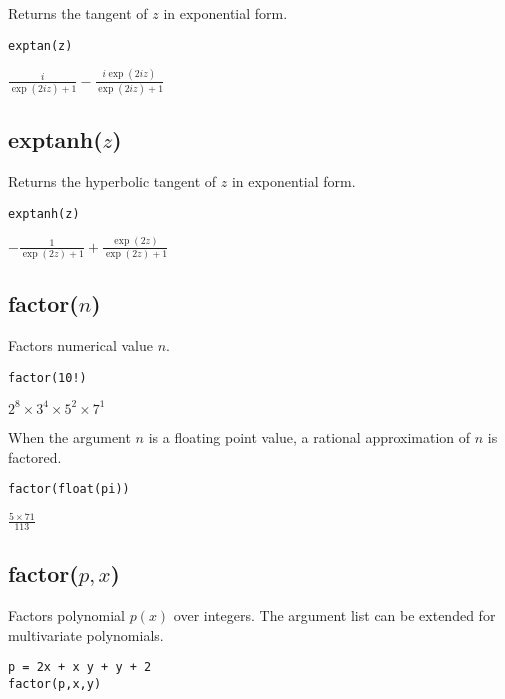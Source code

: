 Returns the tangent of $z$ in exponential form.

{\color{blue}
\begin{verbatim}
exptan(z)
\end{verbatim}
}

\noindent
$\displaystyle \frac{i}{\exp(2iz)+1}-\frac{i\exp(2iz)}{\exp(2iz)+1}$

\subsection*{exptanh($z$)}

Returns the hyperbolic tangent of $z$ in exponential form.

{\color{blue}
\begin{verbatim}
exptanh(z)
\end{verbatim}
}

\noindent
$\displaystyle -\frac{1}{\exp(2z)+1}+\frac{\exp(2z)}{\exp(2z)+1}$

\subsection*{factor($n$)}

Factors numerical value $n$.

{\color{blue}
\begin{verbatim}
factor(10!)
\end{verbatim}
}

\noindent
$\displaystyle 2^8\times 3^4\times 5^2\times 7^1$

\bigskip
\noindent
When the argument $n$ is a floating point value,
a rational approximation of $n$ is factored.

{\color{blue}
\begin{verbatim}
factor(float(pi))
\end{verbatim}
}

\noindent
$\displaystyle \frac{5\times 71}{113}$

\subsection*{factor($p,x$)}

Factors polynomial $p(x)$ over integers.
The argument list can be extended for multivariate polynomials.

{\color{blue}
\begin{verbatim}
p = 2x + x y + y + 2
factor(p,x,y)
\end{verbatim}
}

